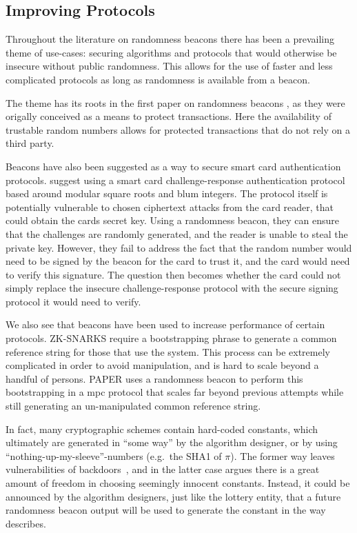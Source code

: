 \subsection{Improving Protocols}
Throughout the literature on randomness beacons there has been a prevailing theme of use-cases: securing algorithms and protocols that would otherwise be insecure without public randomness. This allows for the use of faster and less complicated protocols as long as randomness is available from a beacon.

The theme has its roots in the first paper on randomness beacons \cite{rabin1983transaction}, as they were origally conceived as a means to protect transactions. Here the availability of trustable random numbers allows for protected transactions that do not rely on a third party.  

Beacons have also been suggested as a way to secure smart card authentication protocols. \citet{fischer2011publicrandomnessservice} suggest using a smart card challenge-response authentication protocol based around modular square roots and blum integers. The protocol itself is potentially vulnerable to chosen ciphertext attacks from the card reader, that could obtain the cards secret key. Using a randomness beacon, they can ensure that the challenges are randomly generated, and the reader is unable to steal the private key. However, they fail to address the fact that the random number would need to be signed by the beacon for the card to trust it, and the card would need to verify this signature. The question then becomes whether the card could not simply replace the insecure challenge-response protocol with the secure signing protocol it would need to verify.

We also see that beacons have been used to increase performance of certain protocols. ZK-SNARKS require a bootstrapping phrase to generate a common reference string for those that use the system. This process can be extremely complicated in order to avoid manipulation, and is hard to scale beyond a handful of persons. PAPER uses a randomness beacon to perform this bootstrapping in a mpc protocol that scales far beyond previous attempts while still generating an un-manipulated common reference string.

In fact, many cryptographic schemes contain hard-coded constants, which ultimately are generated in \enquote{some way} by the algorithm designer, or by using \enquote{nothing-up-my-sleeve}-numbers (e.g.\ the SHA1 of $\pi$).
The former way leaves vulnerabilities of backdoors~, and in the latter case  argues there is a great amount of freedom in choosing seemingly innocent constants.
Instead, it could be announced by the algorithm designers, just like the lottery entity, that a future randomness beacon output will be used to generate the constant in the way  describes.